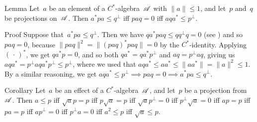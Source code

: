 \documentclass[main]{subfiles}
\begin{document}
\begin{parsec}[ad-contraposed]%
\begin{point}{Lemma}%
Let~$a$ be an element of a $C^*$-algebra~$\mathscr{A}$
with $\|a\|\leq 1$,
and let~$p$ and~$q$ be projections on~$\mathscr{A}$.
Then 
$a^* p a \leq q^\perp$
iff $paq=0$
iff  $aqa^*\leq p^\perp$.
\end{point}
\begin{point}{Proof}%
Suppose that~$a^*pa\leq q^\perp$.
Then we have $q a^*pa q \leq qq^\perp q = 0$
(see )
and so $paq=0$,
because $\|paq\|^2=\|(paq)^*paq\|=0$
by the $C^*$-identity.
Applying $(\,\cdot\,)^*$,
we get $qa^*p=0$, and so both $qa^* = qa^*p^\perp$
and $aq = p^\perp aq$, giving
us $aqa^* = p^\perp a q a^* p^\perp 
\leq p^\perp$,
where we used that $aqa^*\leq aa^*\leq \|aa^*\|=\|a\|^2\leq 1$.
By a similar reasoning,
we get $aqa^*\leq p^\perp \implies paq=0\implies a^*pa\leq q^\perp$.
\end{point}
\begin{point}{Corollary}%
Let~$a$ be an effect of a $C^*$-algebra~$\mathscr{A}$,
and let~$p$ be a projection from~$\mathscr{A}$.
Then $a\leq p$ iff $\sqrt{a}p=p$ iff $p\sqrt{a}=p$
iff $\sqrt{a}p^\perp = 0$ iff $p^\perp\sqrt{a}=0$ 
iff  $ap=p$ iff $pa=p$ iff $ap^\perp=0$ iff $p^\perp a=0$
iff $a^2 \leq p$
iff $\sqrt{a}\leq p$.
\end{point}
\end{parsec}
\end{document}

